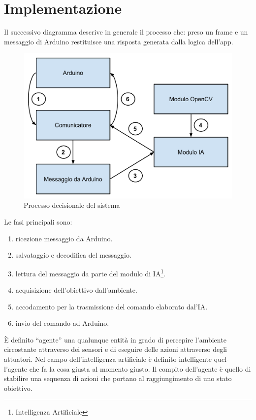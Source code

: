 \chapter{Implementazione}
\fancyfoot[C]{\thepage }
Il successivo diagramma descrive in generale il processo che: preso un frame e un messaggio
di Arduino restituisce una risposta generata dalla logica dell'app.
\begin{figure}[H] \center
\includegraphics[width=\textwidth]{immagini/schema_processo_new.pdf}
\caption{Processo decisionale del sistema} 
\end{figure}
Le fasi principali sono:
\begin{enumerate}
\item ricezione messaggio da Arduino.
\item salvataggio e decodifica del messaggio.
\item lettura del messaggio da parte del modulo di IA\footnote{Intelligenza Artificiale}.
\item acquisizione dell'obiettivo dall'ambiente.
\item accodamento per la trasmissione del comando elaborato dal'IA.
\item invio del comando ad Arduino.
\end{enumerate}
È definito ``agente'' una qualunque entità in grado di percepire l'ambiente
circostante attraverso dei sensori e di eseguire delle azioni attraverso degli
attuatori. Nel campo dell'intelligenza artificiale è definito intelligente quel-
l'agente che fa la cosa giusta al momento giusto. Il compito dell'agente è
quello di stabilire una sequenza di azioni che portano al raggiungimento di
uno stato obiettivo.\cite{agente}
